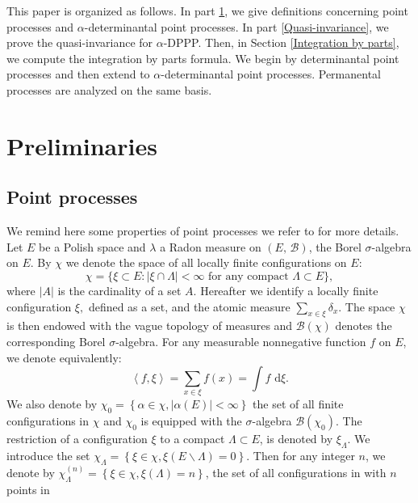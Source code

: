 \documentclass[11pt,a4paper]{amsart}
\begin{document}
This paper is organized as follows. In part \ref{preliminaries}, we
give definitions concerning point processes and
$\alpha$-de\-ter\-mi\-nan\-tal point processes. In part
\ref{Quasi-invariance}, we prove the quasi-invariance for
$\alpha$-DPPP. Then, in Section \ref{Integration by parts}, we compute
the integration by parts formula. We begin by determinantal point
processes and then extend to $\alpha$-determinantal point
processes. Permanental processes are analyzed on the same basis.

\section{Preliminaries}\label{preliminaries}
\subsection{Point processes}
We remind here some properties of point processes we refer to
\cite{MR1950431,kallenberg83} for more details.  Let $E$ be a Polish
space and $\lambda$ a Radon measure on $(E,\, \mathcal{B})$, the Borel
$\sigma$-algebra on $E.$ By $\chi$ we denote the space of all locally
finite configurations on $E$:
\begin{equation*}\label{}
  \chi= \{ \xi\subset E: |\xi \cap \Lambda|< \infty
  \text{ for any compact } \Lambda \subset E  \},
\end{equation*}
where $|A|$ is the cardinality of a set $A$. Hereafter we identify a
locally finite configuration $\xi,$ defined as a set, and the atomic
measure $\sum_{x \in \xi}\delta_x$. The space $\chi$ is then endowed
with the vague topology of measures and $\mathcal{B}(\chi)$ denotes
the corresponding Borel $\sigma$-algebra. For any measurable
nonnegative function $f$ on $E$, we denote equivalently:
\begin{equation*}
  \left\langle f,\xi \right\rangle =
  \sum_{x\in \xi}f(x)=\int{f {\text{ d}}\xi}.
\end{equation*}
We also denote by $\chi_{0}=\left\lbrace \alpha \in \chi, \mid
  \alpha(E) \mid < \infty \right\rbrace$ the set of all finite
configurations in $\chi$ and $\chi_{0}$ is equipped with the
$\sigma$-algebra $\mathcal{B}(\chi_0)$.
The restriction of a configuration $\xi$ to a compact $\Lambda\subset
E$, is denoted by $\xi_\Lambda$. We introduce the set
$\chi_{\Lambda}=\left\lbrace \xi \in \chi, \xi(E\backslash\Lambda) =0
\right\rbrace$. Then for any integer $n$, we denote by
$\chi_{\Lambda}^{(n)}=\left\lbrace \xi \in \chi, \xi(\Lambda) =n
\right\rbrace$, the set of all configurations in with $n$ points in
\end{document}
